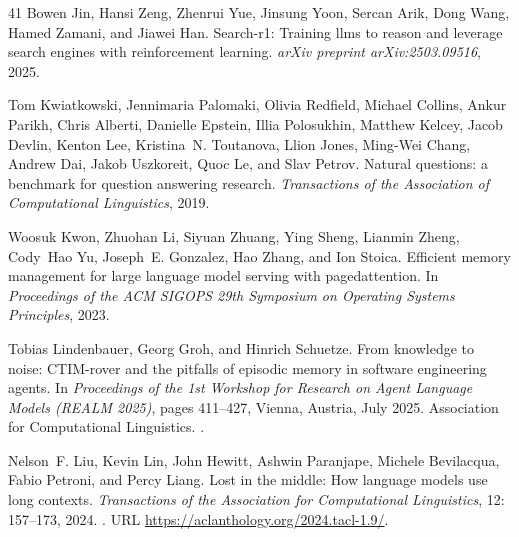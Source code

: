\documentclass{article}
\begin{document}
\begin{thebibliography}{41}
Bowen Jin, Hansi Zeng, Zhenrui Yue, Jinsung Yoon, Sercan Arik, Dong Wang, Hamed Zamani, and Jiawei Han.
\newblock Search-r1: Training llms to reason and leverage search engines with reinforcement learning.
\newblock \emph{arXiv preprint arXiv:2503.09516}, 2025.

Tom Kwiatkowski, Jennimaria Palomaki, Olivia Redfield, Michael Collins, Ankur Parikh, Chris Alberti, Danielle Epstein, Illia Polosukhin, Matthew Kelcey, Jacob Devlin, Kenton Lee, Kristina~N. Toutanova, Llion Jones, Ming-Wei Chang, Andrew Dai, Jakob Uszkoreit, Quoc Le, and Slav Petrov.
\newblock Natural questions: a benchmark for question answering research.
\newblock \emph{Transactions of the Association of Computational Linguistics}, 2019.

Woosuk Kwon, Zhuohan Li, Siyuan Zhuang, Ying Sheng, Lianmin Zheng, Cody~Hao Yu, Joseph~E. Gonzalez, Hao Zhang, and Ion Stoica.
\newblock Efficient memory management for large language model serving with pagedattention.
\newblock In \emph{Proceedings of the ACM SIGOPS 29th Symposium on Operating Systems Principles}, 2023.

Tobias Lindenbauer, Georg Groh, and Hinrich Schuetze.
\newblock From knowledge to noise: {CTIM}-rover and the pitfalls of episodic memory in software engineering agents.
\newblock In \emph{Proceedings of the 1st Workshop for Research on Agent Language Models (REALM 2025)}, pages 411--427, Vienna, Austria, July 2025. Association for Computational Linguistics.
\newblock {}.

Nelson~F. Liu, Kevin Lin, John Hewitt, Ashwin Paranjape, Michele Bevilacqua, Fabio Petroni, and Percy Liang.
\newblock Lost in the middle: How language models use long contexts.
\newblock \emph{Transactions of the Association for Computational Linguistics}, 12: 157--173, 2024.
\newblock {}.
\newblock URL \url{https://aclanthology.org/2024.tacl-1.9/}.


\end{thebibliography}
\end{document}
